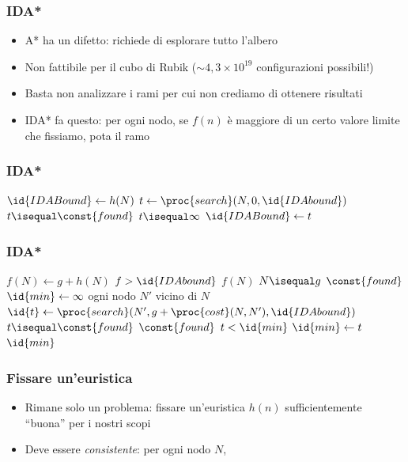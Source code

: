\documentclass{beamer}
\begin{document}
\begin{frame}
\frametitle{IDA*}
\begin{itemize}
\item A* ha un difetto: richiede di esplorare tutto l'albero
\item Non fattibile per il cubo di Rubik ($\sim 4,3\times 10^{19}$
configurazioni possibili!)
\item Basta non analizzare i rami per cui non crediamo di ottenere risultati
\item IDA* fa questo: per ogni nodo, se $f(n)$ è maggiore di un certo valore
limite che fissiamo, pota il ramo
\end{itemize}
\end{frame}

\begin{frame}
\frametitle{IDA*}
\begin{codebox}
\li $\id{IDABound}\gets h(N)$
\li \While {}
\li \Do
        $t\gets\proc{search}(N, 0, \id{IDAbound})$
\li     \If $t\isequal\const{found}$
\li     \Then
            \Return {}
        \End
\li     \If $t\isequal\infty$
\li     \Then
            \Return {}
        \End
\li     $\id{IDABound}\gets t$
    \End
\end{codebox}
\end{frame}

\begin{frame}
\frametitle{IDA*}
\begin{codebox}
\li $f(N)\gets g + h(N)$
\li \If $f > \id{IDAbound}$
\li \Then
        \Return $f(N)$
    \End
\li \If $N\isequal g$
\li \Then
        \Return $\const{found}$
    \End
\li $\id{min}\gets\infty$
\li \For ogni nodo $N'$ vicino di $N$
\li \Do
        $\id{t}\gets\proc{search}(N', g + \proc{cost}(N, N'), \id{IDAbound})$
\li     \If $t\isequal\const{found}$
\li     \Then
            \Return $\const{found}$
        \End
\li     \If $t < \id{min}$
\li     \Then
            $\id{min}\gets t$
        \End
    \End
\li \Return $\id{min}$
\end{codebox}
\end{frame}

\begin{frame}
\frametitle{Fissare un'euristica}
\begin{itemize}
\item Rimane solo un problema: fissare un'euristica $h(n)$ sufficientemente 
``buona'' per i nostri scopi
\item Deve essere \emph{consistente}: per ogni nodo $N$,
\end{itemize}
\end{frame}
\end{document}
